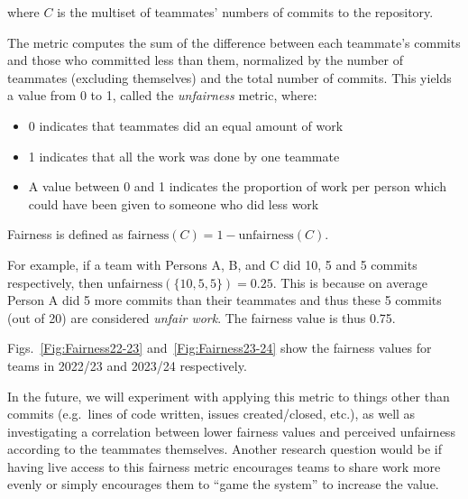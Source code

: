 \documentclass[10pt, conference]{IEEEtran}
\begin{document}
\noindent where $C$ is the multiset of teammates' numbers of commits to the 
repository.

The metric computes the sum of the difference between each teammate's commits
and those who committed less than them, normalized by the number of teammates
(excluding themselves) and the total number of commits. This yields a value
from 0 to 1, called the \textit{unfairness} metric, where:

\begin{itemize}
  \item 0 indicates that teammates did an equal amount of work
  \item 1 indicates that all the work was done by one teammate
  \item A value between 0 and 1 indicates the proportion of work 
        per person which could have been given to someone who did less work
\end{itemize}

Fairness is defined as $\text{fairness}(C) = 1 - \text{unfairness}(C)$.

For example, if a team with Persons A, B, and C did 10, 5 and 5 commits respectively, then
$\text{unfairness}(\{10,5,5\}) = 0.25$. This is because on average Person A did 5 more commits than
their teammates and thus these 5 commits (out of 20) are considered \textit{unfair work}. The fairness 
value is thus 0.75.

Figs.~\ref{Fig:Fairness22-23} and~\ref{Fig:Fairness23-24} show the fairness values for 
teams in 2022/23 and 2023/24 respectively.

In the future, we will experiment with applying this metric to things other than commits (e.g.~lines of
code written, issues created/closed, etc.), as well as investigating a correlation between
lower fairness values and perceived unfairness according to the teammates themselves. Another
research question would be if having live access to this fairness metric encourages teams to share
work more evenly or simply encourages them to ``game the system'' to increase the value.
\end{document}
